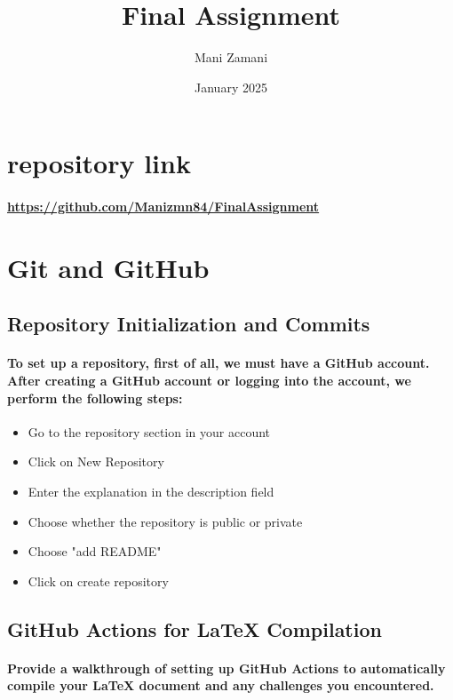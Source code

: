 \documentclass[11pt]{article}
\title{Final Assignment}
\author{Mani Zamani}
\date{January 2025}
\begin{document}
\maketitle
\newpage
\tableofcontents
\newpage

\section{repository link}
\paragraph{\url{https://github.com/Manizmn84/FinalAssignment}}

\section{Git and GitHub}
\subsection{Repository Initialization and Commits}

\paragraph{To set up a repository, first of all, we must have a GitHub account. After creating a GitHub account or logging into the account, we perform the following steps:}

\begin{itemize}
    \item Go to the repository section in your account
    \item Click on New Repository
    \item Enter the explanation in the description field
    \item Choose whether the repository is public or private
    \item Choose "add README"
    \item Click on create repository 
\end{itemize}

\subsection{GitHub Actions for LaTeX Compilation}
\paragraph{Provide a walkthrough of setting up GitHub Actions to automatically compile your LaTeX document and any challenges you encountered.}
\end{document}
